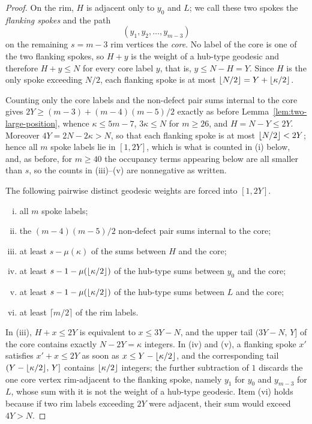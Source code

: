 \documentclass[11pt]{article}
\theoremstyle{definition}
\theoremstyle{remark}
\numberwithin{equation}{section}
\DeclarePairedDelimiter{\floor}{\lfloor}{\rfloor}
\begin{document}
\begin{proof}
On the rim, $H$ is adjacent only to $y_0$ and $L$; we call these two spokes the
\emph{flanking spokes} and the path
\[
  (y_1,y_2,\ldots,y_{m-3})
\]
on the remaining $s=m-3$ rim vertices the \emph{core}. No label of the core is
one of the two flanking spokes, so $H+y$ is the weight of a hub-type geodesic and
therefore $H+y\le N$ for every core label $y$, that is, $y\le N-H=Y$. Since $H$
is the only spoke exceeding $N/2$, each flanking spoke is at most
$\floor{N/2}=Y+\floor{\kappa/2}$.

Counting only the core labels and the non-defect pair sums internal to the core
gives $2Y\ge(m-3)+(m-4)(m-5)/2$ exactly as before
Lemma~\ref{lem:two-large-position}, whence $\kappa\le5m-7$, $3\kappa\le N$ for
$m\ge26$, and $H=N-Y\le2Y$. Moreover $4Y=2N-2\kappa>N$, so that each flanking
spoke is at most $\floor{N/2}<2Y$; hence all $m$ spoke labels lie in $[1,2Y]$,
which is what is counted in (i) below, and, as before, for $m\ge40$ the
occupancy terms appearing below are all smaller than $s$, so the counts in
(iii)--(v) are nonnegative as written.

The following pairwise distinct geodesic weights are forced into $[1,2Y]$.
\begin{enumerate}[(i)]
\item all $m$ spoke labels;
\item the $(m-4)(m-5)/2$ non-defect pair sums internal to the core;
\item at least $s-\mu(\kappa)$ of the sums between $H$ and the core;
\item at least $s-1-\mu(\floor{\kappa/2})$ of the hub-type sums between $y_0$ and the core;
\item at least $s-1-\mu(\floor{\kappa/2})$ of the hub-type sums between $L$ and the core;
\item at least $\lceil m/2\rceil$ of the rim labels.
\end{enumerate}
In (iii), $H+x\le2Y$ is equivalent to $x\le3Y-N$, and the upper tail
$(3Y-N,\,Y]$ of the core contains exactly $N-2Y=\kappa$ integers. In (iv) and
(v), a flanking spoke $x'$ satisfies $x'+x\le2Y$ as soon as
$x\le Y-\floor{\kappa/2}$, and the corresponding tail
$(Y-\floor{\kappa/2},\,Y]$ contains $\floor{\kappa/2}$ integers; the further
subtraction of $1$ discards the one core vertex rim-adjacent to the flanking
spoke, namely $y_1$ for $y_0$ and $y_{m-3}$ for $L$, whose sum with it is not the
weight of a hub-type geodesic. Item (vi) holds because if two rim labels
exceeding $2Y$ were adjacent, their sum would exceed $4Y>N$.


\end{proof}
\end{document}

